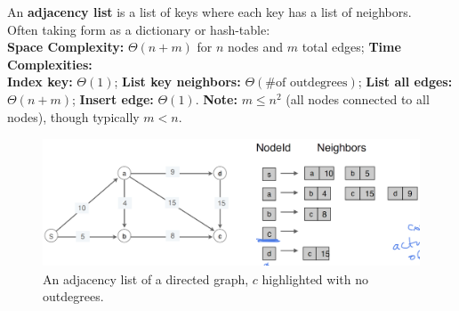 \newpage
\begin{Def}

  \label{def:adj_list}
    An \textbf{adjacency list} is a list of keys where each key has a list of neighbors.\\

    \noindent
    Often taking form as a dictionary or hash-table:\\
    \textbf{Space Complexity:} $\Theta (n+m)$ for $n$ nodes and $m$ total edges; \textbf{Time Complexities:}\\
    \textbf{Index key:} $\Theta (1)$; \textbf{List key neighbors:} $\Theta(\text{\# of outdegrees})$; \textbf{List all edges:} $\Theta(n+m)$;
    \textbf{Insert edge:} $\Theta(1)$. \textbf{Note:} $m\leq n^2$ (all nodes connected to all nodes), though typically $m < n$.
\end{Def}

\begin{figure}[h]
  \begin{center}
    \includegraphics[height=1.5in]{./Sections/graphs/adj_list.png}
  \end{center}
   \caption{An adjacency list of a directed graph, $c$ highlighted with no outdegrees.}\label{fig:adj_list}
\end{figure}







